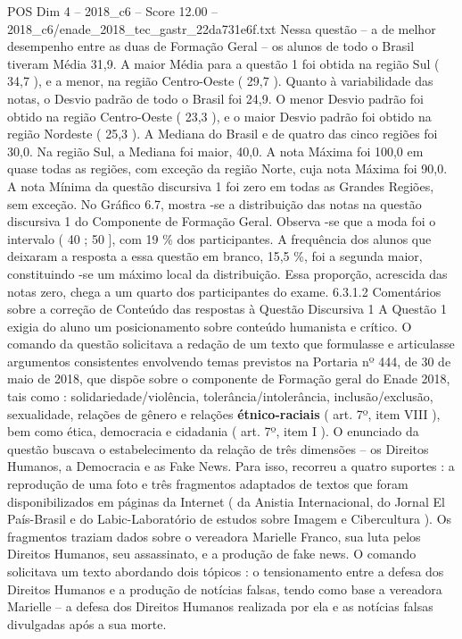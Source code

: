 \begin{textsample}{POS Dim 4 – 2018\_c6 – Score 12.00 – 2018\_c6/enade\_2018\_tec\_gastr\_22da731e6f.txt}
Nessa questão – a de melhor desempenho entre as duas de Formação Geral – os alunos de todo o Brasil tiveram Média 31,9.
A maior Média para a questão 1 foi obtida na região Sul ( 34,7 ), e a menor, na região Centro-Oeste ( 29,7 ).
Quanto à variabilidade das notas, o Desvio padrão de todo o Brasil foi 24,9.
O menor Desvio padrão foi obtido na região Centro-Oeste ( 23,3 ), e o maior Desvio padrão foi obtido na região Nordeste ( 25,3 ).
A Mediana do Brasil e de quatro das cinco regiões foi 30,0.
Na região Sul, a Mediana foi maior, 40,0.
A nota Máxima foi 100,0 em quase todas as regiões, com exceção da região Norte, cuja nota Máxima foi 90,0.
A nota Mínima da questão discursiva 1 foi zero em todas as Grandes Regiões, sem exceção.
No Gráfico 6.7, mostra -se a distribuição das notas na questão discursiva 1 do Componente de Formação Geral.
Observa -se que a moda foi o intervalo ( 40 ; 50 ], com 19 \% dos participantes.
A frequência dos alunos que deixaram a resposta a essa questão em branco, 15,5 \%, foi a segunda maior, constituindo -se um máximo local da distribuição.
Essa proporção, acrescida das notas zero, chega a um quarto dos participantes do exame. 6.3.1.2 Comentários sobre a correção de Conteúdo das respostas à Questão Discursiva 1 A Questão 1 exigia do aluno um posicionamento sobre conteúdo humanista e crítico.
O comando da questão solicitava a redação de um texto que formulasse e articulasse argumentos consistentes envolvendo temas previstos na Portaria nº 444, de 30 de maio de 2018, que dispõe sobre o componente de Formação geral do Enade 2018, tais como : solidariedade/violência, tolerância/intolerância, inclusão/exclusão, sexualidade, relações de gênero e relações \textbf{étnico-raciais} ( art. 7º, item VIII ), bem como ética, democracia e cidadania ( art. 7º, item I ).
O enunciado da questão buscava o estabelecimento da relação de três dimensões – os Direitos Humanos, a Democracia e as Fake News.
Para isso, recorreu a quatro suportes : a reprodução de uma foto e três fragmentos adaptados de textos que foram disponibilizados em páginas da Internet ( da Anistia Internacional, do Jornal El País-Brasil e do Labic-Laboratório de estudos sobre Imagem e Cibercultura ).
Os fragmentos traziam dados sobre o vereadora Marielle Franco, sua luta pelos Direitos Humanos, seu assassinato, e a produção de fake news.
O comando solicitava um texto abordando dois tópicos : o tensionamento entre a defesa dos Direitos Humanos e a produção de notícias falsas, tendo como base a vereadora Marielle – a defesa dos Direitos Humanos realizada por ela e as notícias falsas divulgadas após a sua morte.

\end{textsample}
